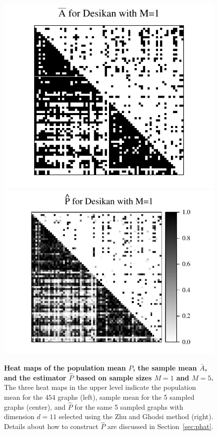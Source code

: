 \documentclass[10pt,letterpaper]{article}
\renewcommand{\hat}{\widehat}
\begin{document}
\begin{figure}[!tbp]
\includegraphics[height=.201\textheight]{Abar_desikan_m1.pdf} \hspace{-35pt}
\includegraphics[height=.205\textheight]{Phat_desikan_m1.pdf}
\caption{{\bf Heat maps of the population mean $P$, the sample mean $\bar{A}$, and the estimator $\hat{P}$ based on sample sizes $M = 1$ and $M = 5$.}
The three heat maps in the upper level indicate the population mean for the $454$ graphs (left), sample mean for the 5 sampled graphs (center), and $\hat{P}$ for the same 5 sampled graphs with dimension $d=11$ selected using the Zhu and Ghodsi method (right). Details about how to construct $\hat{P}$ are discussed in Section~\ref{sec:phat}.
}
\end{figure}
\end{document}
